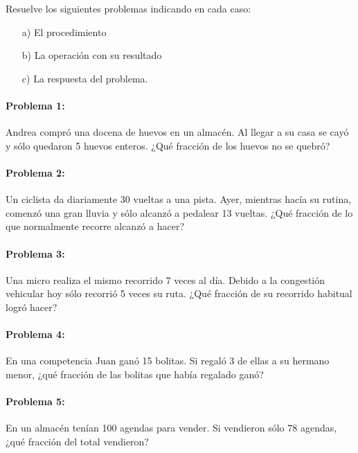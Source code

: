 \documentclass[10pt,twoside]{article}
\begin{document}
Resuelve los siguientes problemas indicando en cada caso:
\begin{enumerate}
 \item[a)] El procedimiento
 \item[b)] La operación con su resultado
 \item[c)] La respuesta del problema.
\end{enumerate}
\paragraph*{Problema 1:}
Andrea compró una docena de huevos en un almacén. Al llegar a su casa se cayó y sólo quedaron 5 huevos enteros. ¿Qué fracción de los huevos no se quebró?
\paragraph*{Problema 2:}
Un ciclista da diariamente 30 vueltas a una pista. Ayer, mientras hacía su rutina, comenzó una gran lluvia y sólo alcanzó a pedalear 13 vueltas. ¿Qué fracción de lo que normalmente recorre alcanzó a hacer?
\paragraph*{Problema 3:}
Una micro realiza el mismo recorrido 7 veces al día. Debido a la congestión vehicular hoy sólo recorrió 5 veces su ruta. ¿Qué fracción de su recorrido habitual logró hacer?
\paragraph*{Problema 4:}
En una competencia Juan ganó 15 bolitas. Si regaló 3 de ellas a su hermano menor, ¿qué fracción de las bolitas que había regalado ganó?
\paragraph*{Problema 5:}
En un almacén tenían 100 agendas para vender. Si vendieron sólo 78 agendas, ¿qué fracción del total vendieron?
\end{document}
